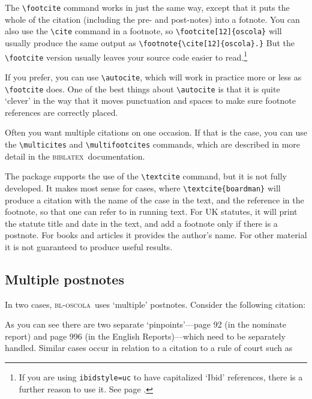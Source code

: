 \documentclass[a4paper,
               11pt,
	       DIV=1,			   
	       footinclude=false]
	      {scrartcl}
\newcommand{\oscola}{\textsc{bl-oscola}}
\newcommand{\biblatex}{\textsc{biblatex}}
\begin{document}
The \verb|\footcite| command works in just the same way, except that
it puts the whole of the citation (including the pre- and post-notes)
into a fotnote.
You can also use the \verb|\cite| command in a
footnote, so \verb|\footcite[12]{oscola}| will usually produce the same output as
\verb|\footnote{\cite[12]{oscola}.}| But the \verb|\footcite| version usually leaves your source code easier to read.\footnote{If you are using \texttt{ibidstyle=uc} to have capitalized `Ibid' references, there is a further reason to use it. See page \pageref{ibidstyle}.}

If you prefer, you can use \verb|\autocite|, which will work in
practice more or less as \verb|\footcite| does.
One of the best things about
\verb|\autocite| is that it is quite `clever' in the way that it moves
punctuation and spaces to make sure footnote references are correctly
placed.

Often you want multiple citations on one occasion. If that is the
case, you can use the \verb|\multicites| and \verb|\multifootcites|
commands, which are described in more detail in the \biblatex\
documentation.

The package supports the use of the \verb|\textcite| command, but it
is not fully developed. It makes most sense for cases, where
\verb|\textcite{boardman}| will produce a citation with the name of
the case in the text, and the reference in the footnote, so that one
can refer to \textcite{boardman} in running text. For UK statutes, it
will print the statute title and date in the text, and add a footnote
only if there is a postnote. For books and articles it provides the
author's name. For other material it is not guaranteed to produce
useful results.



\subsection{Multiple postnotes}
 In two cases, \oscola\ uses `multiple' postnotes. Consider the following citation:
\begin{center}
\cite[92|996]{henly28}
\end{center}
As you can see there are two separate `pinpoints'---{}page 92 (in the nominate report) and page 996 (in the English Reports){}---which need to be separately handled. Similar cases occur in relation to a citation to a rule of court such as
\begin{center}
\cite[11|6]{rsc}
\end{center} 
\end{document}
